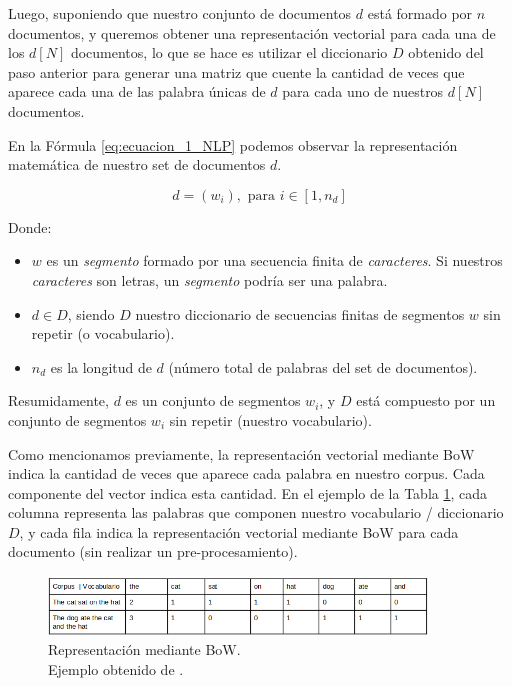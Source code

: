\documentclass[12pt,a4paper]{article}
\begin{document}
\begin{sloppypar}
Luego, suponiendo que nuestro conjunto de documentos $d$  está formado por $n$ documentos, y queremos obtener una representación vectorial para cada una de los $d[N]$ documentos, lo que se hace es utilizar el diccionario $D$ obtenido del paso anterior para generar una matriz que cuente la cantidad de veces que aparece cada una de las palabra únicas de $d$ para cada uno de nuestros $d[N]$ documentos.

En la Fórmula \ref{eq:ecuacion_1_NLP} podemos observar la representación matemática de nuestro set de documentos  $d$.

\begin{equation}\label{eq:ecuacion_1_NLP}
d = (w_i),      \text{    para  } i\in[1,n_d] 
\end{equation}

Donde:
\begin{itemize}
\item $w$ es un \textit{segmento} formado por una secuencia finita de \textit{caracteres}. Si nuestros \textit{caracteres} son letras, un \textit{segmento} podría ser una palabra.
\item $d \in D$, siendo $D$ nuestro diccionario de secuencias finitas de segmentos $w$ sin repetir (o vocabulario). 
\item $n_d$ es la longitud de $d$ (número total de palabras del set de documentos).
\end{itemize}

Resumidamente, $d$ es un conjunto de segmentos $w_i$, y $D$ está compuesto por un conjunto de segmentos $w_i$ sin repetir (nuestro vocabulario).

\cleardoublepage

Como mencionamos previamente, la representación vectorial mediante BoW indica la cantidad de veces que aparece cada palabra en nuestro corpus. Cada componente del vector indica esta cantidad. En el ejemplo de la Tabla \ref{fig:Imagen_NLP_6}, cada columna representa las palabras que componen nuestro vocabulario / diccionario $D$, y cada fila indica la representación vectorial mediante BoW para cada documento (sin realizar un pre-procesamiento).

\begin{figure}[H]    
 \centering
 \includegraphics[width=0.9\textwidth]{images/NLP/6.png}
 \caption{Representación mediante BoW. \\ Ejemplo obtenido de \cite{NLP_8}.}
 \label{fig:Imagen_NLP_6}
\end{figure}


\end{sloppypar}
\end{document}
